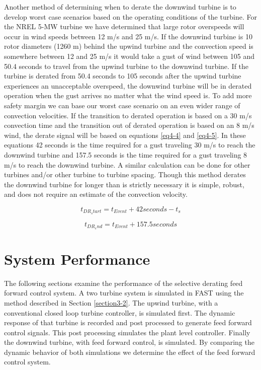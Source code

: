 Another method of determining when to derate the downwind turbine is to develop worst case scenarios based on the operating conditions of the turbine. For the NREL 5-MW turbine we have determined that large rotor overspeeds will occur in wind speeds between 12 m/s and 25 m/s. If the downwind turbine is 10 rotor diameters (1260 m) behind the upwind turbine and the convection speed is somewhere between 12 and 25 m/s it would take a gust of wind between 105 and 50.4 seconds to travel from the upwind turbine to the downwind turbine. If the turbine is derated from 50.4 seconds to 105 seconds after the upwind turbine experiences an unacceptable overspeed, the downwind turbine will be in derated operation when the gust arrives no matter what the wind speed is. To add more safety margin we can base our worst case scenario on an even wider range of convection velocities. If the transition to derated operation is based on a 30 m/s convection time and the transition out of derated operation is based on an 8 m/s wind, the derate signal will be based on equations \ref{eq4-4} and \ref{eq4-5}. In these equations 42 seconds is the time required for a gust traveling 30 m/s to reach the downwind turbine and 157.5 seconds is the time required for a gust traveling 8 m/s to reach the downwind turbine.  A similar calculation can be done for other turbines and/or other turbine to turbine spacing. Though this method derates the downwind turbine for longer than is strictly necessary it is simple, robust, and does not require an estimate of the convection velocity.

\begin{equation}
	t_{DR_start} = t_{Event} + 42 seconds - t_s \label{eq4-4}
\end{equation}

\begin{equation}
	t_{DR_end} = t_{Event} + 157.5 seconds \label{eq4-5}
\end{equation}


\section{System Performance} \label{section4-6}

The following sections examine the performance of the selective derating feed forward control system. A two turbine system is simulated in FAST using the method described in Section \ref{section3-2}. The upwind turbine, with a conventional closed loop turbine controller,  is simulated first. The dynamic response of that turbine is recorded and post processed to generate feed forward control signals. This post processing simulates the plant level controller. Finally the downwind turbine, with feed forward control, is simulated. By comparing the dynamic behavior of both simulations we determine the effect of the feed forward control system.

